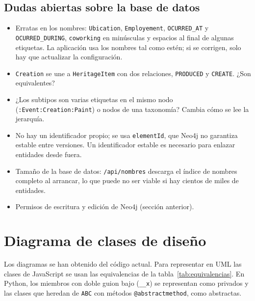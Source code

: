 \subsection{Dudas abiertas sobre la base de datos}
\label{sec:bd-dudas}

\begin{itemize}
  \item Erratas en los nombres: \texttt{Ubication}, \texttt{Employement}, \texttt{OCURRED\_AT} y \texttt{OCURRED\_DURING}, \texttt{coworking} en minúsculas y espacios al final de algunas etiquetas. La aplicación usa los nombres tal como estén; si se corrigen, solo hay que actualizar la configuración.
  \item \texttt{Creation} se une a \texttt{HeritageItem} con dos relaciones, \texttt{PRODUCED} y \texttt{CREATE}. ¿Son equivalentes?
  \item ¿Los subtipos son varias etiquetas en el mismo nodo (\texttt{:Event:Creation:Paint}) o nodos de una taxonomía? Cambia cómo se lee la jerarquía.
  \item No hay un identificador propio; se usa \texttt{elementId}, que Neo4j no garantiza estable entre versiones. Un identificador estable es necesario para enlazar entidades desde fuera.
  \item Tamaño de la base de datos: \texttt{/api/nombres} descarga el índice de nombres completo al arrancar, lo que puede no ser viable si hay cientos de miles de entidades.
  \item Permisos de escritura y edición de Neo4j (sección anterior).
\end{itemize}

\section{Diagrama de clases de diseño}
\label{sec:clases}

Los diagramas se han obtenido del código actual. Para representar en UML las clases de JavaScript se usan las equivalencias de la tabla~\ref{tab:equivalencias}. En Python, los miembros con doble guion bajo (\texttt{\_\_x}) se representan como privados y las clases que heredan de \texttt{ABC} con métodos \texttt{@abstractmethod}, como abstractas.

